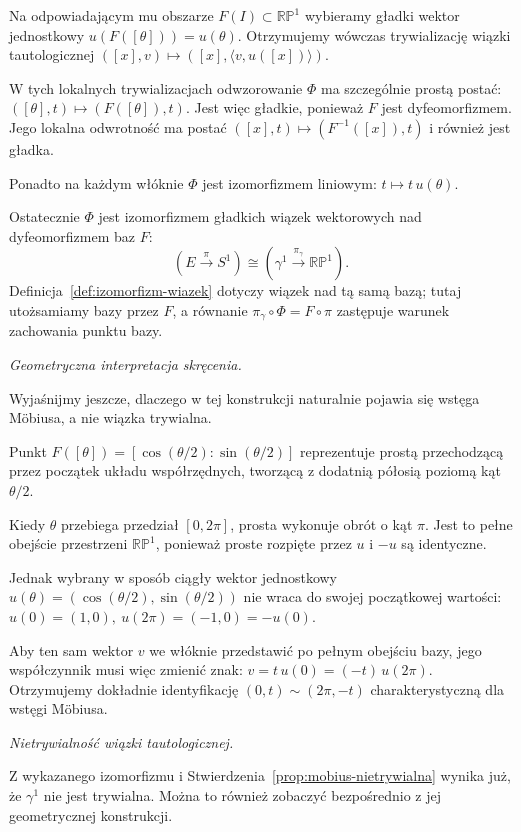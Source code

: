 \begin{przyklad}
Na odpowiadającym mu obszarze $F(I)\subset\mathbb{RP}^1$
wybieramy gładki wektor jednostkowy
$
u(F([\theta]))=u(\theta).
$
Otrzymujemy wówczas trywializację
wiązki tautologicznej $([x],v)\longmapsto ([x],\langle v,u([x])\rangle)$.

W tych lokalnych trywializacjach
odwzorowanie $\Phi$ ma szczególnie prostą postać:
$
([\theta],t)\longmapsto(F([\theta]),t).
$
Jest więc gładkie, ponieważ $F$
jest dyfeomorfizmem.
Jego lokalna odwrotność ma postać
$
([x],t)\longmapsto(F^{-1}([x]),t)
$
i również jest gładka.

Ponadto na każdym włóknie $\Phi$
jest izomorfizmem liniowym:
$
t\longmapsto t\,u(\theta).
$

Ostatecznie $\Phi$ jest izomorfizmem
gładkich wiązek wektorowych nad
dyfeomorfizmem baz $F$:
\[
(E\xrightarrow{\pi}S^1)
\cong
(\gamma^1\xrightarrow{\pi_\gamma}\mathbb{RP}^1).
\]
Definicja~\ref{def:izomorfizm-wiazek} dotyczy wiązek
nad tą samą bazą; tutaj utożsamiamy bazy przez $F$,
a równanie $\pi_\gamma\circ\Phi=F\circ\pi$
zastępuje warunek zachowania punktu bazy.

\medskip
\emph{Geometryczna interpretacja skręcenia.}

Wyjaśnijmy jeszcze, dlaczego w tej konstrukcji
naturalnie pojawia się wstęga Möbiusa,
a nie wiązka trywialna.

Punkt $F([\theta]) = [\cos(\theta/2):\sin(\theta/2)]$
reprezentuje prostą przechodzącą przez początek
układu współrzędnych, tworzącą z dodatnią
półosią poziomą kąt $\theta/2$.

Kiedy $\theta$ przebiega przedział
$[0,2\pi]$, prosta wykonuje obrót o kąt $\pi$.
Jest to pełne obejście przestrzeni $\mathbb{RP}^1$,
ponieważ proste rozpięte przez $u$ i $-u$
są identyczne.

Jednak wybrany w sposób ciągły
wektor jednostkowy
$
u(\theta)
=
(\cos(\theta/2),\sin(\theta/2))
$
nie wraca do swojej początkowej wartości: $u(0)=(1,0),\ u(2\pi)=(-1,0)=-u(0)$.

Aby ten sam wektor $v$ we włóknie
przedstawić po pełnym obejściu bazy,
jego współczynnik musi więc zmienić znak:
$
v=t\,u(0)=(-t)\,u(2\pi).
$
Otrzymujemy dokładnie identyfikację
$
(0,t)\sim(2\pi,-t)
$
charakterystyczną dla wstęgi Möbiusa.

\medskip
\emph{Nietrywialność wiązki tautologicznej.}

Z wykazanego izomorfizmu i
Stwierdzenia~\ref{prop:mobius-nietrywialna}
wynika już, że $\gamma^1$ nie jest trywialna.
Można to również zobaczyć bezpośrednio
z jej geometrycznej konstrukcji.


\end{przyklad}
